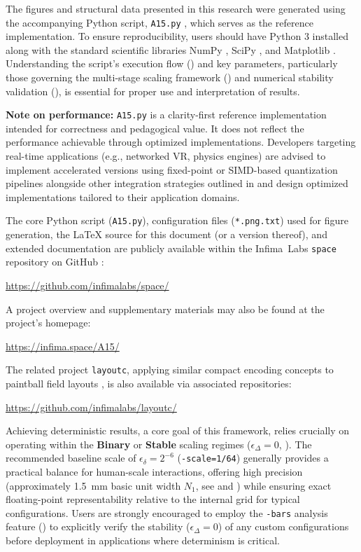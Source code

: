 \documentclass[10pt]{article}
\def\IL{Infima~Labs}
\begin{document}
The figures and structural data presented in this research were generated using the accompanying Python script, \texttt{A15.py} \cite{Risinger2024A15}, which serves as the reference implementation. To ensure reproducibility, users should have Python 3 installed along with the standard scientific libraries NumPy \cite{Harris2020}, SciPy \cite{Virtanen2020}, and Matplotlib \cite{Hunter2007}. Understanding the script's execution flow () and key parameters, particularly those governing the multi-stage scaling framework () and numerical stability validation (), is essential for proper use and interpretation of results.

\textbf{Note on performance:} \texttt{A15.py} is a clarity-first reference implementation intended for correctness and pedagogical value. It does not reflect the performance achievable through optimized implementations. Developers targeting real-time applications (e.g., networked VR, physics engines) are advised to implement accelerated versions using fixed-point or SIMD-based quantization pipelines alongside other integration strategies outlined in  and design optimized implementations tailored to their application domains.

The core Python script (\texttt{A15.py}), configuration files (\texttt{*.png.txt}) used for figure generation, the LaTeX source for this document (or a version thereof), and extended documentation are publicly available within the \IL{} \texttt{space} repository on GitHub \cite{InfimaSpace}:
\begin{center}
    \url{https://github.com/infimalabs/space/}
\end{center}
A project overview and supplementary materials may also be found at the project's homepage:
\begin{center}
    \url{https://infima.space/A15/}
\end{center}
The related project \texttt{layoutc}, applying similar compact encoding concepts to paintball field layouts \cite{Risinger2024Layoutc}, is also available via associated repositories:
\begin{center}
    \url{https://github.com/infimalabs/layoutc/}
\end{center}

Achieving deterministic results, a core goal of this framework, relies crucially on operating within the \textbf{Binary} or \textbf{Stable} scaling regimes ($\epsilon_\Delta = 0$, ). The recommended baseline scale of $\epsilon_\delta = 2^{-6}$ (\texttt{-scale=1/64}) generally provides a practical balance for human-scale interactions, offering high precision (approximately \SI{1.5}{\milli\meter} basic unit width $N_1$, see  and ) while ensuring exact floating-point representability relative to the internal grid for typical configurations. Users are strongly encouraged to employ the \texttt{-bars} analysis feature () to explicitly verify the stability ($\epsilon_\Delta = 0$) of any custom configurations before deployment in applications where determinism is critical.
\end{document}
